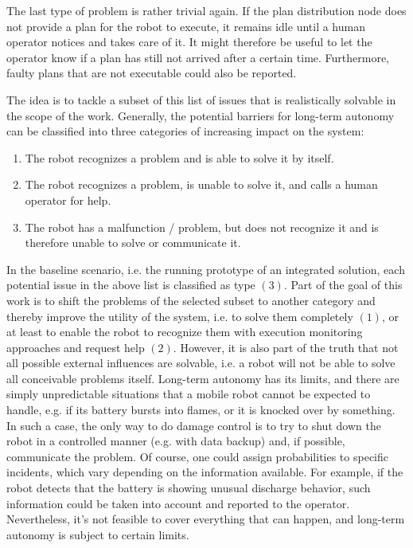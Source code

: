 \documentclass[english, master, utf8]{base/thesis_KBS}
\begin{document}
\noindent
The last type of problem is rather trivial again. If the plan distribution node does not provide a plan for the robot to execute, it remains idle until a human operator 
notices and takes care of it. It might therefore be useful to let the operator know if a plan has still not arrived after a certain time.
Furthermore, faulty plans that are not executable could also be reported.\newline

\noindent
The idea is to tackle a subset of this list of issues that is realistically solvable in the scope of the work.
Generally, the potential barriers for long-term autonomy can be classified into three categories of increasing impact on the system:
\begin{enumerate}
    \item The robot recognizes a problem and is able to solve it by itself.
    \item The robot recognizes a problem, is unable to solve it, and calls a human operator for help.
    \item The robot has a malfunction / problem, but does not recognize it and is therefore unable to solve or communicate it.
\end{enumerate}
In the baseline scenario, i.e. the running prototype of an integrated solution, each potential issue in the above list is classified as type $(3)$.
Part of the goal of this work is to shift the problems of the selected subset to another category and thereby improve the utility of the system, 
i.e. to solve them completely $(1)$, or at least to enable the robot to recognize them with execution monitoring approaches and request help $(2)$.
However, it is also part of the truth that not all possible external influences are solvable, i.e. a robot will not be able to solve all
conceivable problems itself. Long-term autonomy has its limits, and there are simply unpredictable situations that a mobile robot cannot be expected to handle,
e.g. if its battery bursts into flames, or it is knocked over by something. In such a case, the only way to do damage control is to try to shut down the 
robot in a controlled manner (e.g. with data backup) and, if possible, communicate the problem.
Of course, one could assign probabilities to specific incidents, which vary depending on the information available. 
For example, if the robot detects that the battery is showing unusual discharge behavior, such information could be taken into account and 
reported to the operator. Nevertheless, it's not feasible to cover everything that can happen, and long-term autonomy is subject to certain limits.
\end{document}
